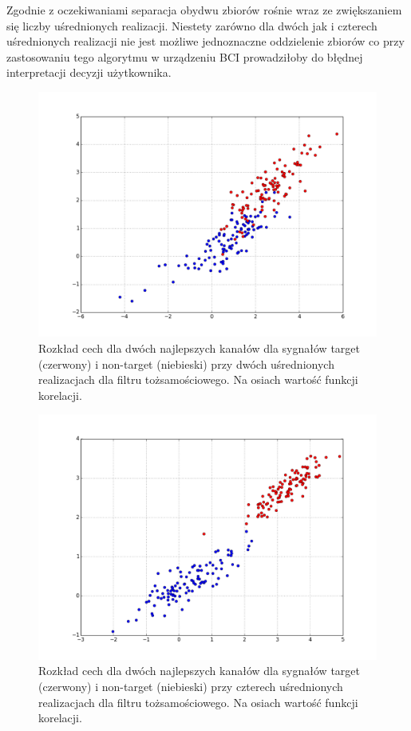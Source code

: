 \documentclass[licencjacka,openright]{pracamgr}
\begin{document}
Zgodnie z oczekiwaniami separacja obydwu zbiorów rośnie wraz ze zwiększaniem się liczby uśrednionych realizacji. Niestety zarówno dla dwóch jak i czterech uśrednionych realizacji nie jest możliwe jednoznaczne oddzielenie zbiorów co przy zastosowaniu tego algorytmu w urządzeniu BCI prowadziłoby do błędnej interpretacji decyzji użytkownika.

\begin{figure}
\centering
\includegraphics[scale=0.55, trim=10mm 15mm 10mm 18mm, clip=True]{pics/cecha_toz_2.png}
\caption{Rozkład cech dla dwóch najlepszych kanałów dla sygnałów target (czerwony) i non-target (niebieski) przy dwóch uśrednionych realizacjach dla filtru tożsamościowego. Na osiach wartość funkcji korelacji.}
\label{cecha_toz_2}
\end{figure}

\begin{figure}
\centering
\includegraphics[scale=0.55, trim=10mm 15mm 10mm 18mm, clip=True]{pics/cecha_toz_4.png}
\caption{Rozkład cech dla dwóch najlepszych kanałów dla sygnałów target (czerwony) i non-target (niebieski) przy czterech uśrednionych realizacjach dla filtru tożsamościowego. Na osiach wartość funkcji korelacji.}
\label{cecha_toz_4}
\end{figure}
\end{document}

